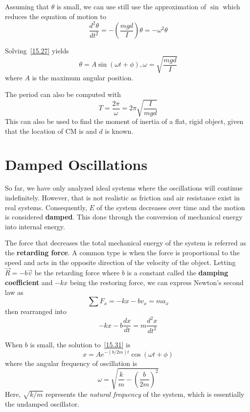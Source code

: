 Assuming that $\theta$ is small, we can use still use the approximation of $\sin$ which reduces the 
equation of motion to 
\begin{equation}\label{15.27}
    \frac{d^2\theta}{dt^2} = -\left(\frac{mgd}{I}\right)\theta = -\omega^2\theta
\end{equation}

Solving~\eqref{15.27} yields 
\begin{equation}
    \theta = A\sin(\omega t + \phi), \omega = \sqrt{\frac{mgd}{I}}
\end{equation}
where $A$ is the maximum angular position.

The period can also be computed with 
\begin{equation}\label{15.28}
    T = \frac{2\pi}{\omega} = 2\pi\sqrt{\frac{I}{mgd}}
\end{equation}
This can also be used to find the moment of inertia of a flat, rigid object, given that the location 
of CM is and $d$ is known.

\section{Damped Oscillations}

So far, we have only analyzed ideal systems where the oscillations will continue indefinitely.
However, that is not realistic as friction and air resistance exist in real systems. Consequently,
$E$ of the system decreases over time and the motion is considered \textbf{damped}. This done through 
the conversion of mechanical energy into internal energy.

The force that decreases the total mechanical energy of the system is referred as the \textbf{retarding
force}. A common type is when the force is proportional to the speed and acts in the opposite direction 
of the velocity of the object. Letting $\vec{R} = -b\vec{v}$ be the retarding force where $b$ is a
constant called the \textbf{damping coefficient} and $-kx$ being the restoring force, we can express 
Newton's second law as \[ \sum F_x = -kx -bv_x = ma_x \] 
then rearranged into
\begin{equation}\label{15.31}
    -kx - b\frac{dx}{dt} = m\frac{d^2x}{dt^2}
\end{equation}

When $b$ is small, the solution to~\eqref{15.31} is
\begin{equation}
    x = Ae^{-(b/2m)t}\cos(\omega t + \phi)
\end{equation}
where the angular frequency of oscillation is 
\begin{equation}
    \omega = \sqrt{\frac{k}{m} - {\left(\frac{b}{2m}\right)}^2}
\end{equation}
Here, $\sqrt{k/m}$ represents the \textit{natural frequency} of the system, which is essentially the 
undamped oscillator.

